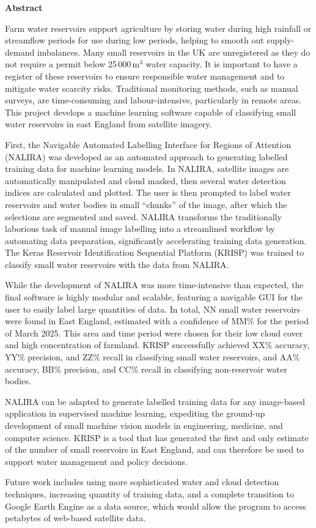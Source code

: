 \newpage
\thispagestyle{plain}
\begin{center}
    \LARGE
    \textbf{Abstract}
    \vspace{0.8cm}
\end{center}
Farm water reservoirs support agriculture by storing water during high rainfall or streamflow periods for use during low periods, helping to smooth out supply-demand imbalances. Many small reservoirs in the UK are unregistered as they do not require a permit below 25\,000\,m$^3$ water capacity. It is important to have a register of these reservoirs to ensure responsible water management and to mitigate water scarcity risks. Traditional monitoring methods, such as manual surveys, are time-consuming and labour-intensive, particularly in remote areas. This project develops a machine learning software capable of classifying small water reservoirs in east England from satellite imagery.

First, the Navigable Automated Labelling Interface for Regions of Attention (NALIRA) was developed as an automated approach to generating labelled training data for machine learning models. In NALIRA, satellite images are automatically manipulated and cloud masked, then several water detection indices are calculated and plotted. The user is then prompted to label water reservoirs and water bodies in small “chunks” of the image, after which the selections are segmented and saved. NALIRA transforms the traditionally laborious task of manual image labelling into a streamlined workflow by automating data preparation, significantly accelerating training data generation. The Keras Reservoir Identification Sequential Platform (KRISP) was trained to classify small water reservoirs with the data from NALIRA.

While the development of NALIRA was more time-intensive than expected, the final software is highly modular and scalable, featuring a navigable GUI for the user to easily label large quantities of data. In total, NN small water reservoirs were found in East England, estimated with a confidence of MM\% for the period of March 2025. This area and time period were chosen for their low cloud cover and high concentration of farmland. KRISP successfully achieved XX\% accuracy, YY\% precision, and ZZ\% recall in classifying small water reservoirs, and AA\% accuracy, BB\% precision, and CC\% recall in classifying non-reservoir water bodies. 

NALIRA can be adapted to generate labelled training data for any image-based application in supervised machine learning, expediting the ground-up development of small machine vision models in engineering, medicine, and computer science. KRISP is a tool that has generated the first and only estimate of the number of small reservoirs in East England, and can therefore be used to support water management and policy decisions. 

Future work includes using more sophisticated water and cloud detection techniques, increasing quantity of training data, and a complete transition to Google Earth Engine as a data source, which would allow the program to access petabytes of web-based satellite data.
